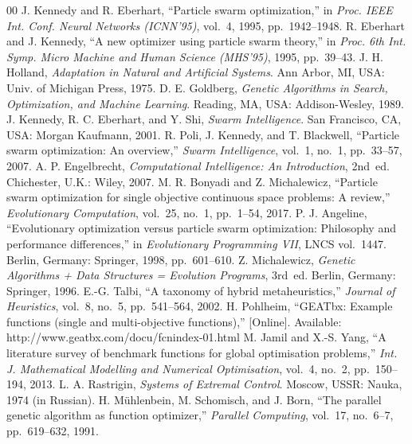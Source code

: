 \documentclass[conference]{IEEEtran}
\begin{document}
\begin{thebibliography}{00}
 J. Kennedy and R. Eberhart, ``Particle swarm
optimization,'' in \textit{Proc. IEEE Int. Conf. Neural Networks (ICNN'95)},
vol.~4, 1995, pp.~1942--1948.
 R. Eberhart and J. Kennedy, ``A new optimizer using
particle swarm theory,'' in \textit{Proc. 6th Int. Symp. Micro Machine and
Human Science (MHS'95)}, 1995, pp.~39--43.
 J. H. Holland, \textit{Adaptation in Natural and
Artificial Systems}. Ann Arbor, MI, USA: Univ. of Michigan Press, 1975.
 D. E. Goldberg, \textit{Genetic Algorithms in Search,
Optimization, and Machine Learning}. Reading, MA, USA: Addison-Wesley, 1989.
 J. Kennedy, R. C. Eberhart, and Y. Shi,
\textit{Swarm Intelligence}. San Francisco, CA, USA: Morgan Kaufmann, 2001.
 R. Poli, J. Kennedy, and T. Blackwell, ``Particle swarm
optimization: An overview,'' \textit{Swarm Intelligence}, vol.~1, no.~1,
pp.~33--57, 2007.
 A. P. Engelbrecht, \textit{Computational
Intelligence: An Introduction}, 2nd~ed. Chichester, U.K.: Wiley, 2007.
 M. R. Bonyadi and Z. Michalewicz, ``Particle swarm
optimization for single objective continuous space problems: A review,''
\textit{Evolutionary Computation}, vol.~25, no.~1, pp.~1--54, 2017.
 P. J. Angeline, ``Evolutionary optimization versus
particle swarm optimization: Philosophy and performance differences,'' in
\textit{Evolutionary Programming VII}, LNCS vol.~1447. Berlin, Germany:
Springer, 1998, pp.~601--610.
 Z. Michalewicz, \textit{Genetic Algorithms + Data
Structures = Evolution Programs}, 3rd~ed. Berlin, Germany: Springer, 1996.
 E.-G. Talbi, ``A taxonomy of hybrid metaheuristics,''
\textit{Journal of Heuristics}, vol.~8, no.~5, pp.~541--564, 2002.
 H. Pohlheim, ``GEATbx: Example functions (single and
multi-objective functions),'' [Online]. Available:
http://www.geatbx.com/docu/fcnindex-01.html
 M. Jamil and X.-S. Yang, ``A literature survey of
benchmark functions for global optimisation problems,'' \textit{Int. J.
Mathematical Modelling and Numerical Optimisation}, vol.~4, no.~2,
pp.~150--194, 2013.
 L. A. Rastrigin, \textit{Systems of Extremal
Control}. Moscow, USSR: Nauka, 1974 (in Russian).
 H. M\"{u}hlenbein, M. Schomisch, and J. Born, ``The
parallel genetic algorithm as function optimizer,'' \textit{Parallel
Computing}, vol.~17, no.~6--7, pp.~619--632, 1991.

\end{thebibliography}
\end{document}
